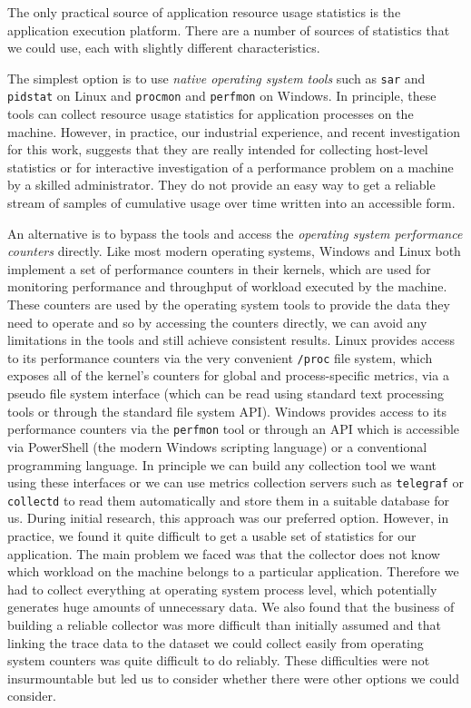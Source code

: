 The only practical source of application resource usage statistics is the application execution platform.  There are a number of sources of statistics that we could use, each with slightly different characteristics.

The simplest option is to use \emph{native operating system tools} such as \texttt{sar} and \texttt{pidstat} on Linux and \texttt{procmon} and \texttt{perfmon} on Windows.  In principle, these tools can collect resource usage statistics for application processes on the machine.  However, in practice, our industrial experience, and recent investigation for this work, suggests that they are really intended for collecting host-level statistics or for interactive investigation of a performance problem on a machine by a skilled administrator.  They do not provide an easy way to get a reliable stream of samples of cumulative usage over time written into an accessible form.

An alternative is to bypass the tools and access the \emph{operating system performance counters} directly.  Like most modern operating systems, Windows and Linux both implement a set of performance counters in their kernels, which are used for monitoring performance and throughput of workload executed by the machine.  These counters are used by the operating system tools to provide the data they need to operate and so by accessing the counters directly, we can avoid any limitations in the tools and still achieve consistent results.  Linux provides access to its performance counters via the very convenient \texttt{{/proc}} file system, which exposes all of the kernel's counters for global and process-specific metrics, via a pseudo file system interface (which can be read using standard text processing tools or through the standard file system API).  Windows provides access to its performance counters via the \texttt{perfmon} tool or through an API which is accessible via PowerShell (the modern Windows scripting language) or a conventional programming language.  In principle we can build any collection tool we want using these interfaces or we can use metrics collection servers such as \texttt{telegraf} or \texttt{collectd} \cite{telegraf2018, collectd2018} to read them automatically and store them in a suitable database for us.  During initial research, this approach was our preferred option. However, in practice, we found it quite difficult to get a usable set of statistics for our application.  The main problem we faced was that the collector does not know which workload on the machine belongs to a particular application.  Therefore we had to collect everything at operating system process level, which potentially generates huge amounts of unnecessary data.  We also found that the business of building a reliable collector was more difficult than initially assumed and that linking the trace data to the dataset we could collect easily from operating system counters was quite difficult to do reliably.  These difficulties were not insurmountable but led us to consider whether there were other options we could consider.

